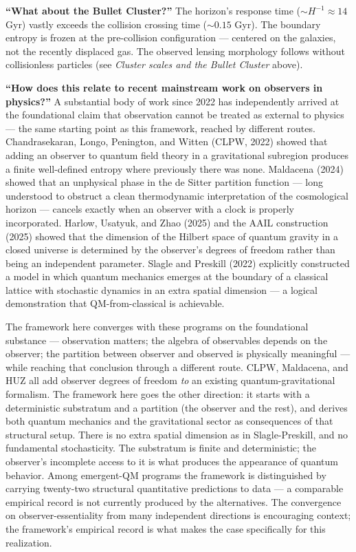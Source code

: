 \documentclass[
]{article}
\begin{document}
\textbf{``What about the Bullet Cluster?''} The horizon's response time
(\(\sim H^{-1} \approx 14\) Gyr) vastly exceeds the collision crossing
time (\(\sim 0.15\) Gyr). The boundary entropy is frozen at the
pre-collision configuration --- centered on the galaxies, not the
recently displaced gas. The observed lensing morphology follows without
collisionless particles (see \emph{Cluster scales and the Bullet
Cluster} above).

\textbf{``How does this relate to recent mainstream work on observers in
physics?''} A substantial body of work since 2022 has independently
arrived at the foundational claim that observation cannot be treated as
external to physics --- the same starting point as this framework,
reached by different routes. Chandrasekaran, Longo, Penington, and
Witten (CLPW, 2022) showed that adding an observer to quantum field
theory in a gravitational subregion produces a finite well-defined
entropy where previously there was none. Maldacena (2024) showed that an
unphysical phase in the de Sitter partition function --- long understood
to obstruct a clean thermodynamic interpretation of the cosmological
horizon --- cancels exactly when an observer with a clock is properly
incorporated. Harlow, Usatyuk, and Zhao (2025) and the AAIL construction
(2025) showed that the dimension of the Hilbert space of quantum gravity
in a closed universe is determined by the observer's degrees of freedom
rather than being an independent parameter. Slagle and Preskill (2022)
explicitly constructed a model in which quantum mechanics emerges at the
boundary of a classical lattice with stochastic dynamics in an extra
spatial dimension --- a logical demonstration that QM-from-classical is
achievable.

The framework here converges with these programs on the foundational
substance --- observation matters; the algebra of observables depends on
the observer; the partition between observer and observed is physically
meaningful --- while reaching that conclusion through a different route.
CLPW, Maldacena, and HUZ all add observer degrees of freedom \emph{to}
an existing quantum-gravitational formalism. The framework here goes the
other direction: it starts with a deterministic substratum and a
partition (the observer and the rest), and derives both quantum
mechanics and the gravitational sector as consequences of that
structural setup. There is no extra spatial dimension as in
Slagle-Preskill, and no fundamental stochasticity. The substratum is
finite and deterministic; the observer's incomplete access to it is what
produces the appearance of quantum behavior. Among emergent-QM programs
the framework is distinguished by carrying twenty-two structural
quantitative predictions to data --- a comparable empirical record is
not currently produced by the alternatives. The convergence on
observer-essentiality from many independent directions is encouraging
context; the framework's empirical record is what makes the case
specifically for this realization.
\end{document}
